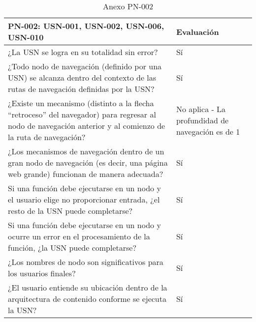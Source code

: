 \begin{table}[htpb]
\centering
\begin{tabularx}{\textwidth}{|X|X|}
\hline
\textbf{PN-002: USN-001, USN-002, USN-006, USN-010}                                                                                                         & \textbf{Evaluación}                              \\ \hline
¿La USN se logra en su totalidad sin error?                                                                                                                & Sí                                               \\ \hline
¿Todo nodo de navegación (definido por una USN) se alcanza dentro del contexto de las rutas de navegación definidas por la USN?                            & Sí                                               \\ \hline
¿Existe un mecanismo (distinto a la flecha ``retroceso'' del navegador) para regresar al nodo de navegación anterior y al comienzo de la ruta de navegación? & No aplica - La profundidad de navegación es de 1 \\ \hline
¿Los mecanismos de navegación dentro de un gran nodo de navegación (es decir, una página web grande) funcionan de manera adecuada?                         & Sí                                               \\ \hline
Si una función debe ejecutarse en un nodo y el usuario elige no proporcionar entrada, ¿el resto de la USN puede completarse?                               & Sí                                               \\ \hline
Si una función debe ejecutarse en un nodo y ocurre un error en el procesamiento de la función, ¿la USN puede completarse?                                  & Sí                                               \\ \hline
¿Los nombres de nodo son significativos para los usuarios finales?                                                                                         & Sí                                               \\ \hline
¿El usuario entiende su ubicación dentro de la arquitectura de contenido conforme se ejecuta la USN?                                                       & Sí                                               \\ \hline
\end{tabularx}
\caption{Anexo PN-002}
\end{table}


